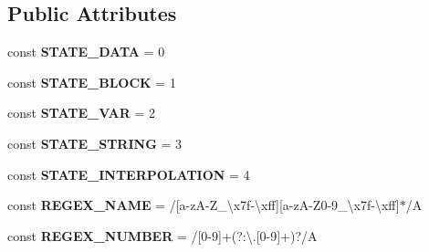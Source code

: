 \subsection*{Public Attributes}
\begin{DoxyCompactItemize}
\item 
const {\bfseries S\+T\+A\+T\+E\+\_\+\+D\+A\+TA} = 0\hypertarget{classTwig__Lexer_ab38f43e09a37211eac243807f09cedd5}{}\label{classTwig__Lexer_ab38f43e09a37211eac243807f09cedd5}

\item 
const {\bfseries S\+T\+A\+T\+E\+\_\+\+B\+L\+O\+CK} = 1\hypertarget{classTwig__Lexer_a4499c0096fc9eee38767cdd5983dc059}{}\label{classTwig__Lexer_a4499c0096fc9eee38767cdd5983dc059}

\item 
const {\bfseries S\+T\+A\+T\+E\+\_\+\+V\+AR} = 2\hypertarget{classTwig__Lexer_ad61cbf25cd9e48d54f8dd92d283e2602}{}\label{classTwig__Lexer_ad61cbf25cd9e48d54f8dd92d283e2602}

\item 
const {\bfseries S\+T\+A\+T\+E\+\_\+\+S\+T\+R\+I\+NG} = 3\hypertarget{classTwig__Lexer_a942d5c5aa18f98a7c41be904f69d48a9}{}\label{classTwig__Lexer_a942d5c5aa18f98a7c41be904f69d48a9}

\item 
const {\bfseries S\+T\+A\+T\+E\+\_\+\+I\+N\+T\+E\+R\+P\+O\+L\+A\+T\+I\+ON} = 4\hypertarget{classTwig__Lexer_a24b5a5ca398ed2e015365f6231643f44}{}\label{classTwig__Lexer_a24b5a5ca398ed2e015365f6231643f44}

\item 
const {\bfseries R\+E\+G\+E\+X\+\_\+\+N\+A\+ME} = \textquotesingle{}/\mbox{[}a-\/zA-\/Z\+\_\+\textbackslash{}x7f-\/\textbackslash{}xff\mbox{]}\mbox{[}a-\/zA-\/Z0-\/9\+\_\+\textbackslash{}x7f-\/\textbackslash{}xff\mbox{]}$\ast$/\+A\textquotesingle{}\hypertarget{classTwig__Lexer_a29de5833a0b18509a59087c81774d010}{}\label{classTwig__Lexer_a29de5833a0b18509a59087c81774d010}

\item 
const {\bfseries R\+E\+G\+E\+X\+\_\+\+N\+U\+M\+B\+ER} = \textquotesingle{}/\mbox{[}0-\/9\mbox{]}+(?\+:\textbackslash{}.\mbox{[}0-\/9\mbox{]}+)?/A\textquotesingle{}\hypertarget{classTwig__Lexer_aa93273c9cd19a2e5a3d9d985e9e06da3}{}\label{classTwig__Lexer_aa93273c9cd19a2e5a3d9d985e9e06da3}


\end{DoxyCompactItemize}
